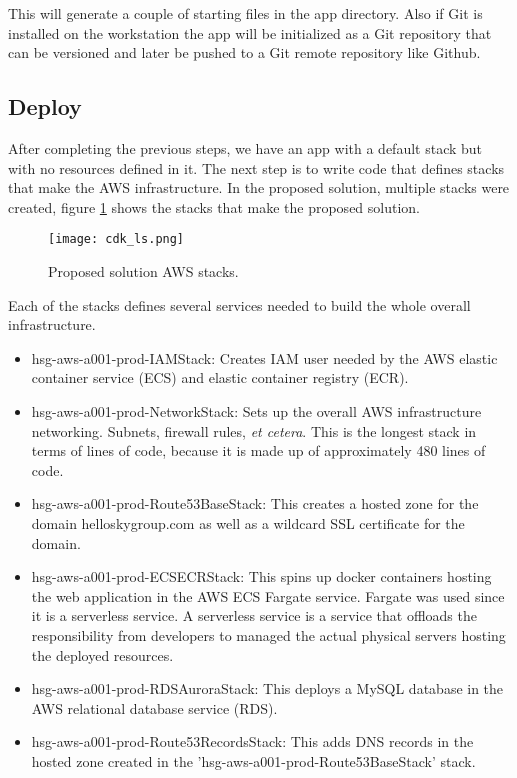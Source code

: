 This will generate a couple of starting files in the app directory. Also if Git is installed on the workstation the app will be initialized as a Git repository that can be versioned and later be pushed to a Git remote repository like Github.

\subsection*{Deploy}

After completing the previous steps, we have an app with a default stack but with no resources defined in it. The next step is to write code that defines stacks that make the AWS infrastructure. In the proposed solution, multiple stacks were created, figure \ref{fig:aws-stacks} shows the stacks that make the proposed solution.

\begin{figure}[H]
    \centering \texttt{[image: cdk\_ls.png]}
    \caption{Proposed solution AWS stacks.}
    \label{fig:aws-stacks}
\end{figure}

Each of the stacks defines several services needed to build the whole overall infrastructure.
\begin{itemize}
    \item hsg-aws-a001-prod-IAMStack: Creates IAM user needed by the AWS elastic container service (ECS) and elastic container registry (ECR).
    \item hsg-aws-a001-prod-NetworkStack: Sets up the overall AWS infrastructure networking. Subnets, firewall rules, \textit{et cetera}. This is the longest stack in terms of lines of code, because it is made up of approximately 480 lines of code.
    \item hsg-aws-a001-prod-Route53BaseStack: This creates a hosted zone for the domain helloskygroup.com as well as a wildcard SSL certificate for the domain.
    \item hsg-aws-a001-prod-ECSECRStack: This spins up docker containers hosting the web application in the AWS ECS Fargate service. Fargate was used since it is a serverless service. A serverless service is a service that offloads the responsibility from developers to managed the actual physical servers hosting the deployed resources.
    \item hsg-aws-a001-prod-RDSAuroraStack: This deploys a MySQL database in the AWS relational database service (RDS).
    \item hsg-aws-a001-prod-Route53RecordsStack: This adds DNS records in the hosted zone created in the 'hsg-aws-a001-prod-Route53BaseStack' stack.
\end{itemize}

